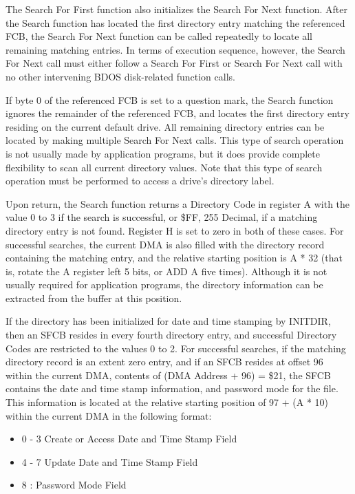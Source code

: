 The Search For First function also initializes the Search For Next
function. After the Search function has located the first directory
entry matching the referenced FCB, the Search For Next function can be
called repeatedly to locate all remaining matching entries. In terms
of execution sequence, however, the Search For Next call must either
follow a Search For First or Search For Next call with no other
intervening BDOS disk-related function calls.

If byte 0 of the referenced FCB is set to a question mark, the Search
function ignores the remainder of the referenced FCB, and locates the
first directory entry residing on the current default drive. All
remaining directory entries can be located by making multiple Search
For Next calls. This type of search operation is not usually made by
application programs, but it does provide complete flexibility to scan
all current directory values. Note that this type of search operation
must be performed to access a drive's directory label.

Upon return, the Search function returns a Directory Code in register
A with the value 0 to 3 if the search is successful, or \$FF, 255
Decimal, if a matching directory entry is not found. Register H is set
to zero in both of these cases. For successful searches, the current
DMA is also filled with the directory record containing the matching
entry, and the relative starting position is A * 32 (that is, rotate
the A register left 5 bits, or ADD A five times). Although it is not
usually required for application programs, the directory information
can be extracted from the buffer at this position.

If the directory has been initialized for date and time stamping by
INITDIR, then an SFCB resides in every fourth directory entry, and
successful Directory Codes are restricted to the values 0 to 2. For
successful searches, if the matching directory record is an extent
zero entry, and if an SFCB resides at offset 96 within the current
DMA, contents of (DMA Address + 96) = \$21, the SFCB contains the date
and time stamp information, and password mode for the file. This
information is located at the relative starting position of 97 + (A *
10) within the current DMA in the following format:

\begin{itemize}
\item 0 - 3 Create or Access Date and Time Stamp Field
\item 4 - 7 Update Date and Time Stamp Field
\item 8 : Password Mode Field
\end{itemize}

